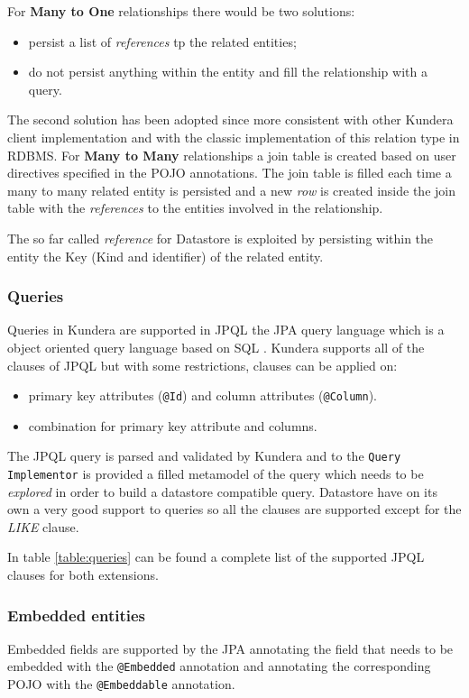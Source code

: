 \noindent For \textbf{Many to One} relationships there would be two solutions:
\begin{itemize}
\item persist a list of \textit{references} tp the related entities;
\item do not persist anything within the entity and fill the relationship with a query.
\end{itemize}
The second solution has been adopted since more consistent with other Kundera client implementation and with the classic implementation of this relation type in RDBMS.
\noindent For \textbf{Many to Many} relationships a join table is created based on user directives specified in the POJO annotations. The join table is filled each time a many to many related entity is persisted and a new \textit{row} is created inside the join table with the \textit{references} to the entities involved in the relationship.

\noindent The so far called \textit{reference} for Datastore is exploited by persisting within the entity the Key (Kind and identifier) of the related entity.

\subsubsection{Queries}
Queries in Kundera are supported in JPQL the JPA query language which is a  object oriented query language based on SQL \cite{book:projpa2}.
Kundera supports all of the clauses of JPQL but with some restrictions, clauses can be applied on:
\begin{itemize}
\item primary key attributes (\texttt{@Id}) and column attributes (\texttt{@Column}).
\item combination for primary key attribute and columns.
\end{itemize}

\newparagraph The JPQL query is parsed and validated by Kundera and to the \texttt{Query Implementor} is provided a filled metamodel of the query which needs to be \textit{explored} in order to build a datastore compatible query.    
Datastore have on its own a very good support to queries so all the clauses are supported except for the \textit{LIKE} clause.

\noindent In table \ref{table:queries} can be found a complete list of the supported JPQL clauses for both extensions.

\subsubsection{Embedded entities}
Embedded fields are supported by the JPA \cite{book:projpa2} annotating the field that needs to be embedded with the \texttt{@Embedded} annotation and annotating the corresponding POJO with the \texttt{@Embeddable} annotation.

